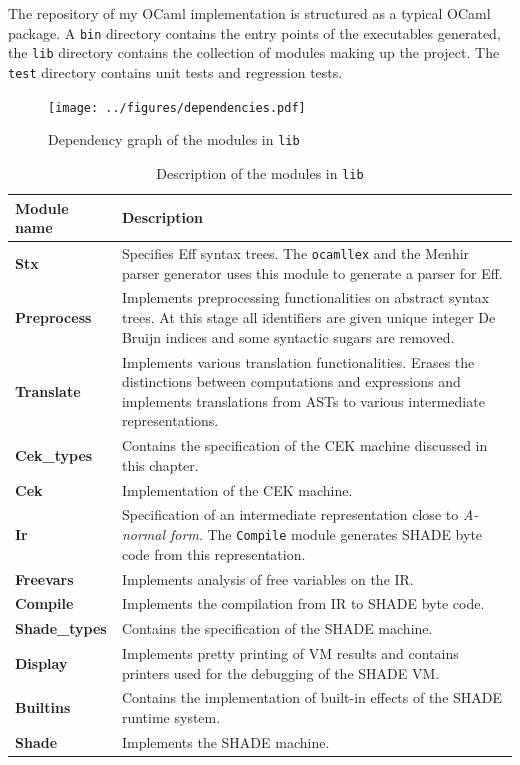 \documentclass[class=article, crop=false]{standalone}
\begin{document}
The repository of my OCaml implementation is structured as a typical OCaml package.
A \verb|bin| directory contains the entry points of the executables generated, the
\verb|lib| directory contains the collection of modules making up the project. The
\verb|test| directory contains unit tests and regression tests.

\begin{figure}
    \centering
    \texttt{[image: ../figures/dependencies.pdf]}
    \caption{Dependency graph of the modules in \texttt{lib}}
    \label{fig:dependencies}
\end{figure}

\begin{table}
    \centering
    {\renewcommand{\arraystretch}{1.3}
    \begin{tabular}{p{3cm}p{10cm}}
    \toprule
    \textbf{Module name} & \textbf{Description} \\
    \midrule
    \textbf{Stx} & 
        Specifies Eff syntax trees. The \verb|ocamllex| and the Menhir parser generator uses this module to generate a parser for Eff.  \\
    \textbf{Preprocess} &
        Implements preprocessing functionalities on abstract syntax trees. At this stage all identifiers are given unique integer De Bruijn indices
        and some syntactic sugars are removed.  \\
    \textbf{Translate} &
        Implements various translation functionalities. Erases the distinctions between computations and expressions and implements translations from ASTs to
        various intermediate representations. \\
    \textbf{Cek\_types} & Contains the specification of the CEK machine discussed in this chapter. \\
    \textbf{Cek} & Implementation of the CEK machine. \\
    \textbf{Ir} & Specification of an intermediate representation close to \emph{A-normal form}. The \verb|Compile| module generates SHADE byte code from this representation. \\
    \textbf{Freevars} & Implements analysis of free variables on the IR. \\
    \textbf{Compile} & Implements the compilation from IR to SHADE byte code. \\
    \textbf{Shade\_types} & Contains the specification of the SHADE machine. \\
    \textbf{Display} & Implements pretty printing of VM results and contains printers used for the debugging of the SHADE VM. \\
    \textbf{Builtins} & Contains the implementation of built-in effects of the SHADE runtime system. \\
    \textbf{Shade} & Implements the SHADE machine. \\
    \bottomrule
    \end{tabular}}
    \caption{Description of the modules in \texttt{lib}}
    \label{tab:lib-modules}
\end{table}
\end{document}
